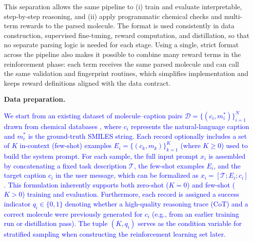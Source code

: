 \documentclass[11pt]{article}
\begin{document}
This separation allows the same pipeline to (i) train and evaluate interpretable, step-by-step reasoning, and (ii) apply programmatic chemical checks and multi-term rewards to the parsed molecule. The format is used consistently in data construction, supervised fine-tuning, reward computation, and distillation, so that no separate parsing logic is needed for each stage. Using a single, strict format across the pipeline also makes it possible to combine many reward terms in the reinforcement phase: each term receives the same parsed molecule and can call the same validation and fingerprint routines, which simplifies implementation and keeps reward definitions aligned with the data contract.

\noindent\textbf{Data preparation.}

\textcolor{blue}{We start from an existing dataset of molecule--caption pairs $\mathcal{D} = \{(c_i, m_i^*)\}_{i=1}^N$ drawn from chemical databases \cite{hastings2016chebi,edwards2022molt5}, where $c_i$ represents the natural-language caption and $m_i^*$ is the ground-truth SMILES string. Each record optionally includes a set of $K$ in-context (few-shot) examples $E_i = \{(c_k, m_k)\}_{k=1}^K$ (where $K \ge 0$) used to build the system prompt. For each sample, the full input prompt $x_i$ is assembled by concatenating a fixed task description $\mathcal{T}$, the few-shot examples $E_i$, and the target caption $c_i$ in the user message, which can be formalized as $x_i = [\mathcal{T}; E_i; c_i]$. This formulation inherently supports both zero-shot ($K=0$) and few-shot ($K>0$) training and evaluation. Furthermore, each record is assigned a success indicator $q_i \in \{0, 1\}$ denoting whether a high-quality reasoning trace (CoT) and a correct molecule were previously generated for $c_i$ (e.g., from an earlier training run or distillation pass). The tuple $(K, q_i)$ serves as the condition variable for stratified sampling when constructing the reinforcement learning set later.}
\end{document}
